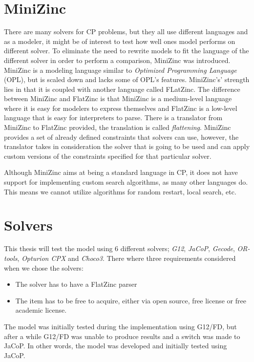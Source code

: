 \section{MiniZinc}
There are many solvers for CP problems, but they all use different languages and as a modeler, it might be of interest to test how well ones model performs on different solver. To eliminate the need to rewrite models to fit the language of the different solver in order to perform a comparison, MiniZinc was introduced. MiniZinc is a modeling language similar to \emph{Optimized Programming Language} (OPL), but is scaled down and lacks some of OPL's features. MiniZinc's' strength lies in that it is coupled with another language called FLatZinc. The difference between MiniZinc and FlatZinc is that MiniZinc is a medium-level language where it is easy for modelers to express themselves and FlatZinc is a low-level language that is easy for interpreters to parse. There is a translator from MiniZinc to FlatZinc provided, the translation is called \emph{flattening}. MiniZinc provides a set of already defined constraints that solvers can use, however, the translator takes in consideration the solver that is going to be used and can apply custom versions of the constraints specified for that particular solver.
\cite{mz_paper}

Although MiniZinc aims at being a standard language in CP, it does not have support for implementing custom search algorithms, as many other languages do. This means we cannot utilize algorithms for random restart, local search, etc.
\cite{mz_paper}

\section{Solvers}
This thesis will test the model using 6 different solvers; \emph{G12}, \emph{JaCoP}, \emph{Gecode}, \emph{OR-tools}, \emph{Opturion CPX} and \emph{Choco3}. There where three requirements considered when we chose the solvers:
\begin{itemize}
\item The solver has to have a FlatZinc parser
\item The item has to be free to acquire, either via open source, free license or free academic license.
\end{itemize}

The model was initially tested during the implementation using G12/FD, but after a while G12/FD was unable to produce results and a switch was made to JaCoP. In other words, the model was developed and initially tested using JaCoP.

